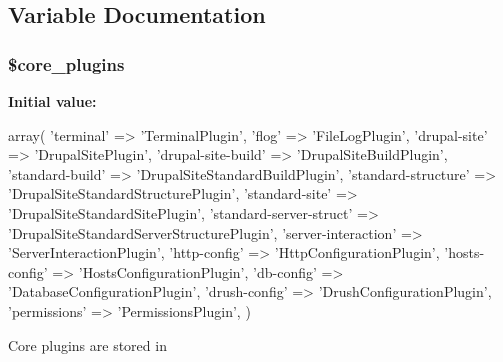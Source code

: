 \subsection{Variable Documentation}
\hypertarget{common_8inc_a9efe6b2fd5e0e018e9883090f254b25c}{
\subsubsection[{\$core\-\_\-plugins}]{\setlength{\rightskip}{0pt plus 5cm}\$core\-\_\-plugins}}\label{common_8inc_a9efe6b2fd5e0e018e9883090f254b25c}
{\bfseries Initial value\-:}
\begin{DoxyCode}
 array(
  \textcolor{stringliteral}{'terminal'} => \textcolor{stringliteral}{'TerminalPlugin'},
  \textcolor{stringliteral}{'flog'} => \textcolor{stringliteral}{'FileLogPlugin'},
  \textcolor{stringliteral}{'drupal-site'} => \textcolor{stringliteral}{'DrupalSitePlugin'},
  \textcolor{stringliteral}{'drupal-site-build'} => \textcolor{stringliteral}{'DrupalSiteBuildPlugin'},
  \textcolor{stringliteral}{'standard-build'} => \textcolor{stringliteral}{'DrupalSiteStandardBuildPlugin'},
  \textcolor{stringliteral}{'standard-structure'} => \textcolor{stringliteral}{'DrupalSiteStandardStructurePlugin'},
  \textcolor{stringliteral}{'standard-site'} => \textcolor{stringliteral}{'DrupalSiteStandardSitePlugin'},
  \textcolor{stringliteral}{'standard-server-struct'} => \textcolor{stringliteral}{'DrupalSiteStandardServerStructurePlugin'},
  \textcolor{stringliteral}{'server-interaction'} => \textcolor{stringliteral}{'ServerInteractionPlugin'},
  \textcolor{stringliteral}{'http-config'} => \textcolor{stringliteral}{'HttpConfigurationPlugin'},
  \textcolor{stringliteral}{'hosts-config'} => \textcolor{stringliteral}{'HostsConfigurationPlugin'},
  \textcolor{stringliteral}{'db-config'} => \textcolor{stringliteral}{'DatabaseConfigurationPlugin'},
  \textcolor{stringliteral}{'drush-config'} => \textcolor{stringliteral}{'DrushConfigurationPlugin'},
  \textcolor{stringliteral}{'permissions'} => \textcolor{stringliteral}{'PermissionsPlugin'},
)
\end{DoxyCode}
Core plugins are stored in

